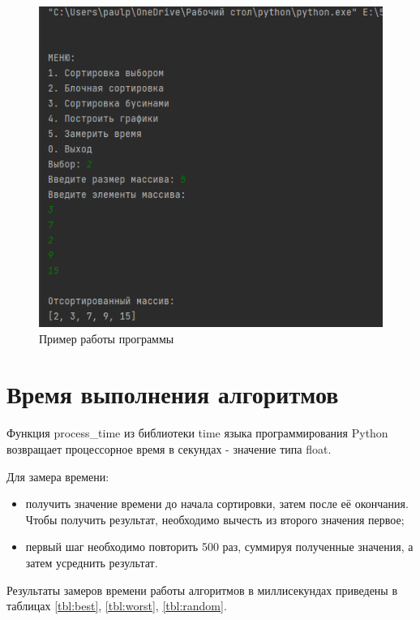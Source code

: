 \begin{figure}[H]
	\begin{center}
		\includegraphics[scale=0.6]{img/example.png}
	\end{center}
	\captionsetup{justification=centering}
	\caption{Пример работы программы}
	\label{img:example}
\end{figure}

\section{Время выполнения алгоритмов}

Функция process\_time из библиотеки time языка программирования Python возвращает  процессорное время в секундах - значение типа float.

Для замера времени:
\begin{itemize}
	\item получить значение времени до начала сортировки, затем после её окончания. Чтобы получить результат, необходимо вычесть из второго значения первое;
	\item первый шаг необходимо повторить 500 раз, суммируя полученные значения, а затем усреднить результат.
\end{itemize}

Результаты замеров времени работы алгоритмов в миллисекундах приведены в таблицах \ref{tbl:best}, \ref{tbl:worst}, \ref{tbl:random}.

